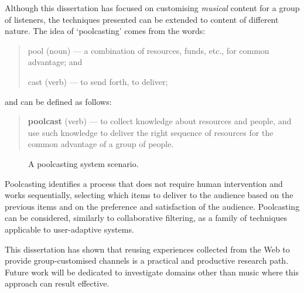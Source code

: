 Although this dissertation has focused on customising \emph{musical} content for a group of listeners, the techniques presented can be extended to  content of different nature.
The idea of `poolcasting' comes from the words:
\begin{quote}
pool (noun) --- a combination of resources, funds, etc., for common advantage; and

cast (verb) --- to send forth, to deliver;
\end{quote}
and can be defined as follows:
\begin{quote}
\textbf{poolcast} (verb)  --- to collect knowledge about resources and people, and use such knowledge to deliver the right sequence of resources for the common advantage of a group of people.
\end{quote}

\begin{figure}[bthp]
\centering \setlength{\abovecaptionskip}{3pt}
\caption{A poolcasting system scenario.}
\label{fig:poolcasting-scenario}
\end{figure}

Poolcasting identifies a process that does not require human intervention and works sequentially, %
selecting which items to deliver to the audience based on the previous items and on the preference and satisfaction of the audience.
Poolcasting can be considered, similarly to collaborative filtering, as a family of techniques applicable to user-adaptive systems.

This dissertation has shown that reusing experiences collected from the Web to provide group-customised channels is a practical and productive research path.
Future work will be dedicated to investigate domains other than music where this approach can result effective.


